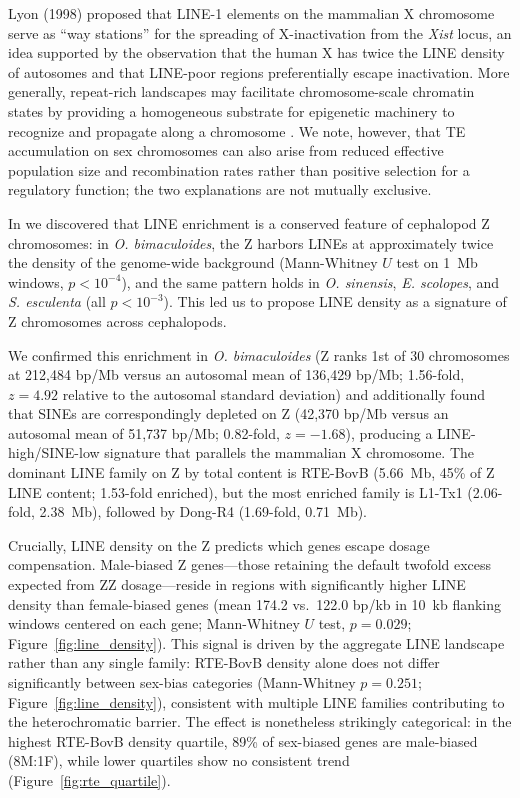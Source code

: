 \documentclass[12pt]{article}
\newcommand{\citep}{\parencite}
\begin{document}
Lyon (1998) proposed that LINE-1 elements on the mammalian X chromosome
serve as ``way stations'' for the spreading of X-inactivation from the \textit{Xist} locus,
an idea supported by the observation that the human X has twice the LINE density of autosomes
and that LINE-poor regions preferentially escape inactivation.
More generally, repeat-rich landscapes may facilitate
chromosome-scale chromatin states
by providing a homogeneous substrate
for epigenetic machinery to recognize and propagate along a chromosome
\citep[e.g.,][]{huang2022species}.
We note, however, that TE accumulation on sex chromosomes
can also arise from reduced effective population size
and recombination rates
rather than positive selection for a regulatory function;
the two explanations are not mutually exclusive.

In \textcite{coffing2025cephalopod} we discovered that LINE enrichment
is a conserved feature of cephalopod Z chromosomes:
in \textit{O. bimaculoides}, the Z harbors LINEs
at approximately twice the density of the genome-wide background
(Mann-Whitney $U$ test on 1~Mb windows, $p < 10^{-4}$),
and the same pattern holds in \textit{O. sinensis},
\textit{E. scolopes}, and \textit{S. esculenta}
(all $p < 10^{-3}$).
This led us to propose LINE density
as a signature of Z chromosomes across cephalopods.

We confirmed this enrichment in \textit{O. bimaculoides}
(Z ranks 1st of 30 chromosomes at 212,484 bp/Mb
versus an autosomal mean of 136,429 bp/Mb;
1.56-fold, $z = 4.92$ relative to the autosomal standard deviation)
and additionally found that SINEs are correspondingly depleted on Z
(42,370 bp/Mb versus an autosomal mean of 51,737 bp/Mb;
0.82-fold, $z = -1.68$),
producing a LINE-high/SINE-low signature
that parallels the mammalian X chromosome.
The dominant LINE family on Z by total content is RTE-BovB
(5.66~Mb, 45\% of Z LINE content; 1.53-fold enriched),
but the most enriched family is L1-Tx1 (2.06-fold, 2.38~Mb),
followed by Dong-R4 (1.69-fold, 0.71~Mb).

Crucially, LINE density on the Z predicts which genes escape dosage compensation.
Male-biased Z genes---those retaining the default twofold excess
expected from ZZ dosage---reside in regions with significantly
higher LINE density than female-biased genes
(mean 174.2 vs.\ 122.0 bp/kb in 10~kb flanking windows centered on each gene;
Mann-Whitney $U$ test, $p = 0.029$;
Figure~\ref{fig:line_density}).
This signal is driven by the aggregate LINE landscape rather than any single family:
RTE-BovB density alone does not differ significantly between sex-bias categories
(Mann-Whitney $p = 0.251$; Figure~\ref{fig:line_density}),
consistent with multiple LINE families contributing to the heterochromatic barrier.
The effect is nonetheless strikingly categorical:
in the highest RTE-BovB density quartile,
89\% of sex-biased genes are male-biased (8M:1F),
while lower quartiles show no consistent trend
(Figure~\ref{fig:rte_quartile}).
\end{document}
